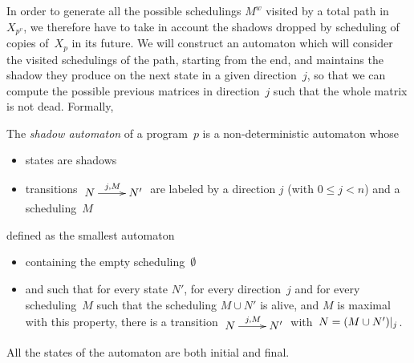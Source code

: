 \documentclass[orivec]{llncs} \usepackage[T1]{fontenc}
\newcommand{\vxym}[1]{\vcenter{\xymatrix{#1}}}
\renewcommand{\leq}{\leqslant}
\begin{document}
In order to generate all the possible schedulings $M^w$ visited by a total path
in~$X_{p^v}$, we therefore have to take in account the shadows dropped by
scheduling of copies of~$X_p$ in its future. We will construct an automaton
which will consider the visited schedulings of the path, starting from the end,
and maintains the shadow they produce on the next state in a given
direction~$j$, so that we can compute the possible previous matrices in
direction~$j$ such that the whole matrix is not dead. Formally,

\begin{definition}
  \label{shadow-automaton}
  The \emph{shadow automaton} of a program~$p$ is a non-deterministic automaton
  whose
  \begin{itemize}
  \item states are shadows
  \item transitions $\vxym{N\ar[r]^{j,M}&N'}$ are labeled by a direction $j$
    (with $0\leq j<n$) and a scheduling~$M$
  \end{itemize}
  defined as the smallest automaton
  \begin{itemize}
  \item containing the empty scheduling~$\emptyset$
  \item and such that for every state $N'$, for every direction~$j$ and for
    every scheduling~$M$ such that the scheduling $M\cup N'$ is alive, and $M$
    is maximal with this property, there is a transition
    $\vxym{N\ar[r]^{j,M}&N'}$ with~$N=\shadow j{(M\cup N')}$.
  \end{itemize}
  All the states of the automaton are both initial and final.
\end{definition}
\end{document}
